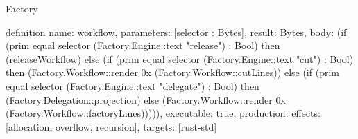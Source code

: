 \begin{lexlean}{Factory}
\begin{semanticmodule}
definition{
  name: workflow,
  parameters: [selector : Bytes],
  result: Bytes,
  body: (if (prim equal selector (Factory.Engine::text "release") : Bool) then (releaseWorkflow) else (if (prim equal selector (Factory.Engine::text "cut") : Bool) then (Factory.Workflow::render 0x (Factory.Workflow::cutLines)) else (if (prim equal selector (Factory.Engine::text "delegate") : Bool) then (Factory.Delegation::projection) else (Factory.Workflow::render 0x (Factory.Workflow::factoryLines))))),
  executable: true,
  production: {effects: [allocation, overflow, recursion], targets: [rust-std]}
}
\end{semanticmodule}
\end{lexlean}
